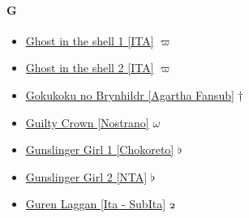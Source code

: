 		\paragraph{G} \hypertarget{SG}{}
			\begin{itemize}
				
				\item \href{https://mega.nz/#F!lThU0AIJ!haNvT6O_UI0e2EAJMS6MVw} {Ghost in the shell 1 [ITA]}  $\varpi$ \\ 
				\item \href{https://mega.nz/#F!7IMXUAyY!954XLnIXVXJR04oZ5y3zUw} {Ghost in the shell 2 [ITA]}  $\varpi$ \\ 
				\item \href{https://mega.nz/#F!7PQFBA6K!nbmsZc0wkNdB7L3QMq1pvg} {Gokukoku no Brynhildr [Agartha Fansub]}  $\dag$ \\ 
				\item \href{https://mega.nz/#F!lQkwQSCY!5qtB8D6zkgsNIZPRnf7hCw} {Guilty Crown [Nostrano]}  $\omega$ \\ 
				\item \href{https://mega.nz/#F!syhwwJyI!lJppY9vjvf-17j0sZZ7lyQ} {Gunslinger Girl 1 [Chokoreto]}  $\flat$ \\ 
				\item \href{https://mega.nz/#F!FigBERqb!ad8nvEMrbj_LJA1rRZq7PQ} {Gunslinger Girl 2 [NTA]}  $\flat$ \\ 
				\item \href{https://mega.nz/#F!veAVHIrJ!vPPgzzG7W08FonOs8ezCkw} {Guren Laggan [Ita - SubIta]}  $\oldstylenums{2}$ \\ 
				
			\end{itemize}
			
